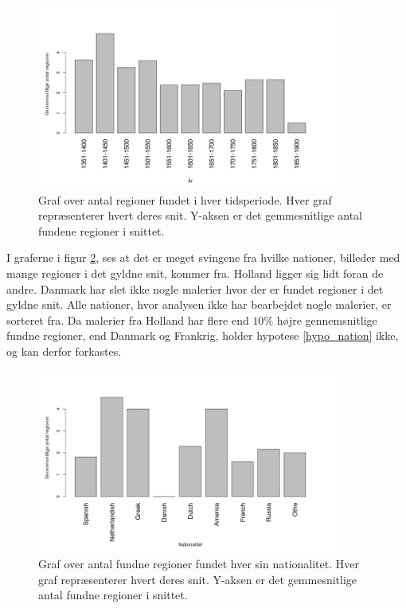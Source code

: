 {\begin{figure}[!h]
	\begin{center}
		\includegraphics[angle=0,width=0.90\textwidth]{afsnit/resultater/billeder/yearcutU.png}
	\end{center}
	\caption{Graf over antal regioner fundet i hver
     tidsperiode. Hver graf repræsenterer hvert deres snit. Y-aksen er
       det gemmesnitlige antal fundene regioner i snittet.}
	\label{udvidet_year}
\end{figure}

I graferne i figur \ref{udvidet_nation}, ses at det er meget svingene
fra hvilke nationer, billeder med mange regioner i det gyldne snit,
kommer fra. Holland ligger sig lidt foran de andre. Danmark har slet
ikke nogle malerier hvor der er fundet regioner i det gyldne snit. Alle
nationer, hvor analysen ikke har bearbejdet nogle malerier, er sorteret
fra. Da malerier fra Holland har flere end $10\%$ højre gennemsnitlige
fundne regioner, end Danmark og Frankrig, holder hypotese
\ref{hypo_nation} ikke, og kan derfor forkastes.


\begin{figure}[!h]
	\begin{center}
		\includegraphics[angle=0,width=0.90\textwidth]{afsnit/resultater/billeder/nationcutU.png}
	\end{center}
	\caption{Graf over antal fundne regioner fundet hver sin
       nationalitet. Hver graf repræsenterer hvert deres snit. Y-aksen
       er det gemmesnitlige antal fundne regioner i snittet.}
	\label{udvidet_nation}
\end{figure}


}
